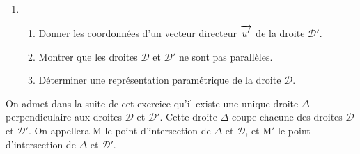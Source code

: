 \documentclass[11pt]{article}
\newcommand{\vect}[1]{\overrightarrow{\,\mathstrut#1\,}}
\begin{document}
\medskip

\begin{enumerate}
\item 

	\begin{enumerate}
		\item Donner les coordonnées d'un vecteur directeur $\vect{u'}$ de la droite $\mathcal{D}'$.
		\item Montrer que les droites $\mathcal{D}$ et $\mathcal{D}'$ ne sont pas parallèles.
		\item Déterminer une représentation paramétrique de la droite $\mathcal{D}$.
	\end{enumerate}
\end{enumerate}

On admet dans la suite de cet exercice qu'il existe une unique droite $\Delta$ perpendiculaire aux droites $\mathcal{D}$ et $\mathcal{D}'$. Cette droite $\Delta$ coupe chacune des droites $\mathcal{D}$ et $\mathcal{D}'$. On appellera M le point d'intersection de $\Delta$ et $\mathcal{D}$, et M$'$ le point d'intersection de $\Delta$ et $\mathcal{D}'$.
\end{document}
